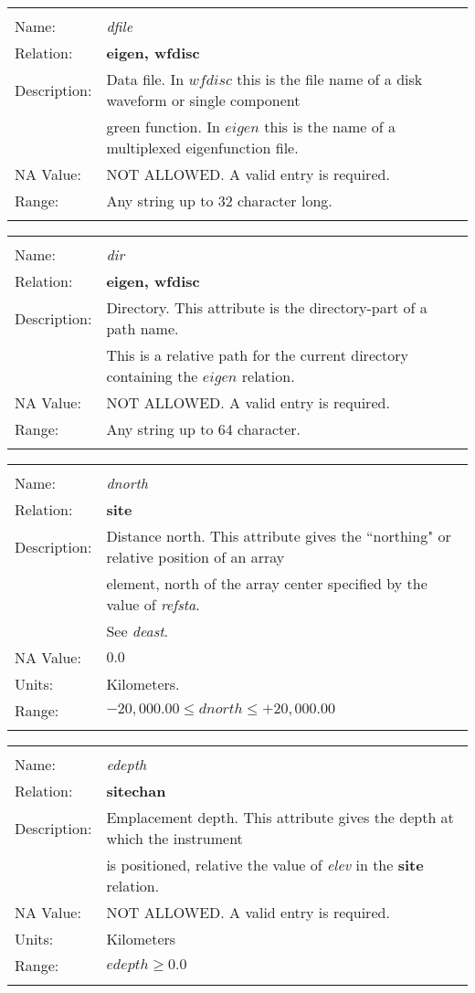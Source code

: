 \begin{tabular*}{6.5 in}{ll} \hline
\\
Name: & {\it dfile} \\
Relation: & {\bf eigen, wfdisc} \\
Description: & Data file. In $wfdisc$ this is the file name of a disk waveform or single component \\
& green function. In $eigen$ this is the name of a multiplexed eigenfunction file. \\
NA Value: & NOT ALLOWED. A valid entry is required. \\
Range: & Any string up to 32 character long. \\
&\\
\end{tabular*}
\begin{tabular*}{6.5 in}{ll} \hline
\\
Name: & {\it dir} \\
Relation: & {\bf eigen, wfdisc} \\
Description: & Directory. This attribute is the directory-part of a path name. \\
& This is a relative path for the current directory containing the $eigen$ relation. \\
NA Value: & NOT ALLOWED. A valid entry is required. \\
Range: & Any string up to 64 character. \\
&\\
\end{tabular*}
\begin{tabular*}{6.5 in}{ll} \hline
\\
Name: & {\it dnorth  } \\
Relation: & {\bf site} \\
Description: & Distance north. This attribute gives the ``northing" or relative position of an array \\
& element, north of the array center specified by the value of {\it refsta}. \\
& See {\it deast}. \\
NA Value: & $0.0$ \\
Units: & Kilometers. \\
Range: & $-20,000.00 \leq dnorth \leq +20,000.00$ \\
&\\
\end{tabular*}
\begin{tabular*}{6.5 in}{ll} \hline
\\
Name: & {\it edepth } \\
Relation: & {\bf sitechan} \\
Description: & Emplacement depth. This attribute gives the depth at which the instrument \\
& is positioned, relative the value of {\it elev} in the {\bf site} relation. \\
NA Value: & NOT ALLOWED. A valid entry is required. \\
Units: & Kilometers \\
Range: & $edepth \geq 0.0$ \\
&\\
\end{tabular*}
